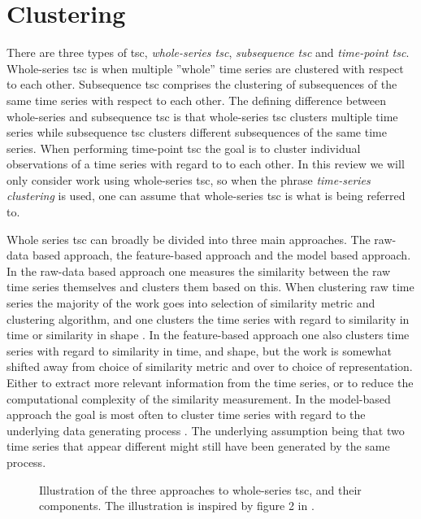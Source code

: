 \section{Clustering} \label{sec:theory_clust}
There are three types of \acrfull{tsc}, \textit{whole-series \acrshort{tsc}}, \textit{subsequence \acrshort{tsc}} and \textit{time-point \acrshort{tsc}}. Whole-series \acrshort{tsc} is when multiple ''whole'' time series are clustered with respect to each other. Subsequence \acrshort{tsc} comprises the clustering of subsequences of the same time series with respect to each other. The defining difference between whole-series and subsequence \acrshort{tsc} is that whole-series \acrshort{tsc} clusters multiple time series while subsequence \acrshort{tsc} clusters different subsequences of the same time series. When performing time-point \acrshort{tsc} the goal is to cluster individual observations of a time series with regard to to each other. In this review we will only consider work using whole-series \acrshort{tsc}, so when the phrase \textit{time-series clustering} is used, one can assume that whole-series \acrshort{tsc} is what is being referred to. \bigskip

Whole series \acrshort{tsc} can broadly be divided into three main approaches. The raw-data based approach, the feature-based approach and the model based approach. In the raw-data based approach one measures the similarity between the raw time series themselves and clusters them based on this. When clustering raw time series the majority of the work goes into selection of similarity metric and clustering algorithm, and one clusters the time series with regard to similarity in time or similarity in shape \cite{tsc_rev}. In the feature-based approach one also clusters time series with regard to similarity in time, and shape, but the work is somewhat shifted away from choice of similarity metric and over to choice of representation. Either to extract more relevant information from the time series, or to reduce the computational complexity of the similarity measurement. In the model-based approach the goal is most often to cluster time series with regard to the underlying data generating process \cite{moar_mpl_tsc}. The underlying assumption being that two time series that appear different might still have been generated by the same process.

\begin{figure}
    \begin{center}
    
    \end{center}
    \caption{Illustration of the three approaches to whole-series \acrshort{tsc}, and their components. The illustration is inspired by figure 2 in \textcite{tsc_rev}.}
    \label{fig:tsc_approaches}
\end{figure}

